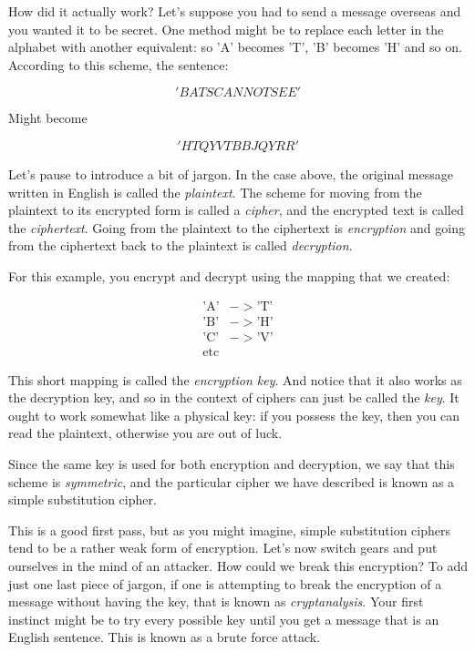 \documentclass[UTF8]{book}
\begin{document}
\begin{CJK}{UTF8}{gbsn}
How did it actually work? Let's suppose you had to send a message overseas and you wanted it to be secret. One method might be to replace each letter in the alphabet with another equivalent: so 'A' becomes 'T', 'B' becomes 'H' and so on. According to this scheme, the sentence:

   \[ 'BATS CANNOT SEE' \]

Might become

   \[ 'HTQY VTBBJQ YRR' \]

Let's pause to introduce a bit of jargon. In the case above, the original message written in English is called the \emph{plaintext}. The scheme for moving from the plaintext to its encrypted form is called a \emph{cipher}, and the encrypted text is called the \emph{ciphertext}. Going from the plaintext to the ciphertext is \emph{encryption} and going from the ciphertext back to the plaintext is called \emph{decryption}.

For this example, you encrypt and decrypt using the mapping that we created:

\begin{align*}
	\text{'A'} &-> \text{'T'} \\
	\text{'B'} &-> \text{'H'} \\
	\text{'C'} &-> \text{'V'} \\
        \text{etc}
\end{align*}

This short mapping is called the \emph{encryption key}. And notice that it also works as the decryption key, and so in the context of ciphers can just be called the \emph{key}. It ought to work somewhat like a physical key: if you possess the key, then you can read the plaintext, otherwise you are out of luck.

Since the same key is used for both encryption and decryption, we say that this scheme is \emph{symmetric}, and the particular cipher we have described is known as a simple substitution cipher.

This is a good first pass, but as you might imagine, simple substitution ciphers tend to be a rather weak form of encryption. Let's now switch gears and put ourselves in the mind of an attacker. How could we break this encryption? To add just one last piece of jargon, if one is attempting to break the encryption of a message without having the key, that is known as \emph{cryptanalysis}. Your first instinct might be to try every possible key until you get a message that is an English sentence. This is known as a brute force attack.


\end{CJK}
\end{document}
